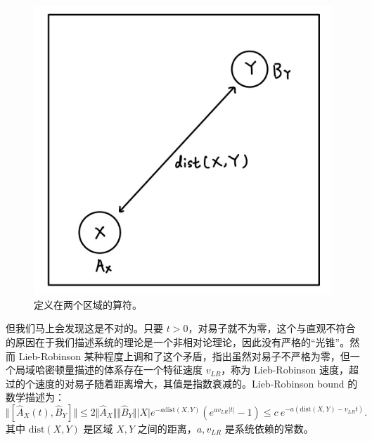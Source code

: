 \documentclass[10pt,UTF8]{ctexart}
\begin{document}
\begin{figure}[H]
\begin{centering}
\includegraphics[width=.4\linewidth]{include/p1}
\par\end{centering}
\caption{定义在两个区域的算符。}
\end{figure}
\noindent
但我们马上会发现这是不对的。只要 $t>0$，对易子就不为零，这个与直观不符合的原因在于我们描述系统的理论是一个非相对论理论，因此没有严格的“光锥”。然而 Lieb-Robinson 某种程度上调和了这个矛盾，指出虽然对易子不严格为零，但一个局域哈密顿量描述的体系存在一个特征速度 $v_{LR}$，称为 Lieb-Robinson 速度，超过的个速度的对易子随着距离增大，其值是指数衰减的。Lieb-Robinson bound 的数学描述为：
\begin{equation}
	\Vert [\hat A_X(t),\hat B_Y] \Vert \le
	2 \Vert \hat A_X \Vert \Vert \hat B_Y \Vert |X| e^{-a \mathrm{dist}(X,Y)}(e^{av_{LR}|t|}-1)
	\le c\ e^{-a(\mathrm{dist}(X,Y)-v_{LR}t)}.
\end{equation}
其中 $\mathrm{dist}(X,Y)$ 是区域 $X,Y$ 之间的距离，$a,v_{LR}$ 是系统依赖的常数。
\end{document}

